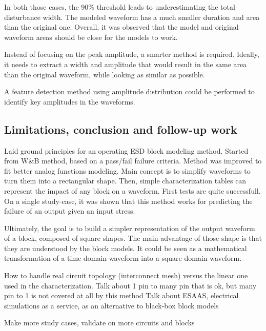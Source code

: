 In both those cases, the 90\% threshold leads to underestimating the total disturbance width.
The modeled waveform has a much smaller duration and area than the original one.
Overall, it was observed that the model and original waveform areas should be close for the models to work.

Instead of focusing on the peak amplitude, a smarter method is required.
Ideally, it needs to extract a width and amplitude that would result in the same area than the original waveform, while looking as similar as possible.

A feature detection method using amplitude distribution could be performed to identify key amplitudes in the waveforms.

\subsection{Limitations, conclusion and follow-up work}

Laid ground principles for an operating ESD block modeling method.
Started from W&B method, based on a pass/fail failure criteria.
Method was improved to fit better analog functions modeling.
Main concept is to simplify waveforms to turn them into a rectangular shape.
Then, simple characterization tables can represent the impact of any block on a waveform.
First tests are quite successfull.
On a single study-case, it was shown that this method works for predicting the failure of an output given an input stress.

Ultimately, the goal is to build a simpler representation of the output waveform of a block, composed of square shapes.
The main advantage of those shape is that they are understood by the block models.
It could be seen as a mathematical transformation of a time-domain waveform into a square-domain waveform.

How to handle real circuit topology (interconnect mesh) versus the linear one used in the characterization.
Talk about 1 pin to many pin that is ok, but many pin to 1 is not covered at all by this method
Talk about ESAAS, electrical simulations as a service, as an alternative to black-box block models


Make more study cases, validate on more circuits and blocks
